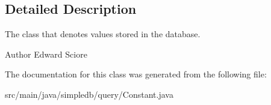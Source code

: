 \subsection{Detailed Description}
The class that denotes values stored in the database. \begin{DoxyAuthor}{Author}
Edward Sciore 
\end{DoxyAuthor}


The documentation for this class was generated from the following file\+:\begin{DoxyCompactItemize}
\item 
src/main/java/simpledb/query/Constant.\+java\end{DoxyCompactItemize}
